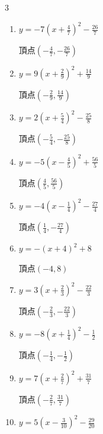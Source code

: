\begin{multicols}{3}
\begin{enumerate}
  \item $\displaystyle y=-7\left( x+\frac{4}{7}\right)^{2}-\frac{26}{7}$

        $\displaystyle 頂点\left( -\frac{4}{7} , -\frac{26}{7} \right)$

  \item $\displaystyle y=9\left( x+\frac{2}{9}\right)^{2}+\frac{14}{9}$

        $\displaystyle 頂点\left( -\frac{2}{9} , \frac{14}{9} \right)$

  \item $\displaystyle y=2\left( x+\frac{5}{4}\right)^{2}-\frac{25}{8}$

        $\displaystyle 頂点\left( -\frac{5}{4} , -\frac{25}{8} \right)$

\columnbreak %

\resetques

  \item $\displaystyle y=-5\left( x-\frac{4}{5}\right)^{2}+\frac{56}{5}$

        $\displaystyle 頂点\left( \frac{4}{5} , \frac{56}{5} \right)$

  \item $\displaystyle y=-4\left( x-\frac{1}{4}\right)^{2}-\frac{27}{4}$

        $\displaystyle 頂点\left( \frac{1}{4} , -\frac{27}{4} \right)$

  \item $\displaystyle y=-\left( x+4\right)^{2}+8$

        $\displaystyle 頂点\left( -4 , 8 \right)$

  \item $\displaystyle y=3\left( x+\frac{2}{3}\right)^{2}-\frac{22}{3}$

        $\displaystyle 頂点\left( -\frac{2}{3} , -\frac{22}{3} \right)$

  \item $\displaystyle y=-8\left( x+\frac{1}{4}\right)^{2}-\frac{1}{2}$

        $\displaystyle 頂点\left( -\frac{1}{4} , -\frac{1}{2} \right)$

  \item $\displaystyle y=7\left( x+\frac{2}{7}\right)^{2}+\frac{31}{7}$

        $\displaystyle 頂点\left( -\frac{2}{7} , \frac{31}{7} \right)$

  \item $\displaystyle y=5\left( x-\frac{3}{10}\right)^{2}-\frac{29}{20}$


\end{enumerate}
\end{multicols}
